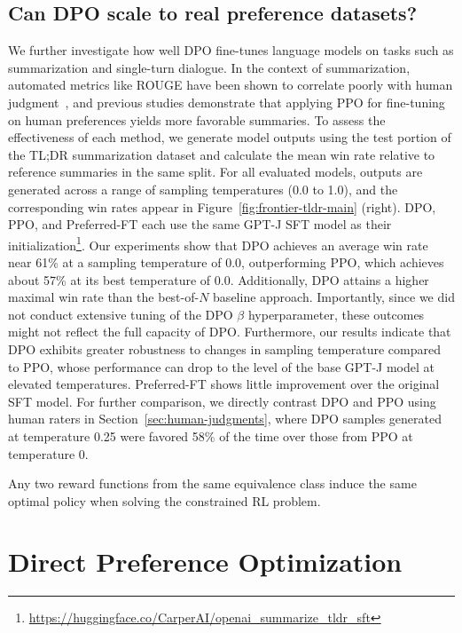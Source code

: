 \subsection{Can DPO scale to real preference datasets?}
\label{sec:dpo-real-datasets}
We further investigate how well DPO fine-tunes language models on tasks such as summarization and single-turn dialogue. In the context of summarization, automated metrics like ROUGE have been shown to correlate poorly with human judgment~\citep{stiennon2022learning}, and previous studies demonstrate that applying PPO for fine-tuning on human preferences yields more favorable summaries. To assess the effectiveness of each method, we generate model outputs using the test portion of the TL;DR summarization dataset and calculate the mean win rate relative to reference summaries in the same split. For all evaluated models, outputs are generated across a range of sampling temperatures (0.0 to 1.0), and the corresponding win rates appear in Figure~\ref{fig:frontier-tldr-main} (right). DPO, PPO, and Preferred-FT each use the same GPT-J SFT model as their initialization\footnote{\url{https://huggingface.co/CarperAI/openai_summarize_tldr_sft}}. Our experiments show that DPO achieves an average win rate near 61\% at a sampling temperature of 0.0, outperforming PPO, which achieves about 57\% at its best temperature of 0.0. Additionally, DPO attains a higher maximal win rate than the best-of-$N$ baseline approach. Importantly, since we did not conduct extensive tuning of the DPO $\beta$ hyperparameter, these outcomes might not reflect the full capacity of DPO. Furthermore, our results indicate that DPO exhibits greater robustness to changes in sampling temperature compared to PPO, whose performance can drop to the level of the base GPT-J model at elevated temperatures. Preferred-FT shows little improvement over the original SFT model. For further comparison, we directly contrast DPO and PPO using human raters in Section~\ref{sec:human-judgments}, where DPO samples generated at temperature 0.25 were favored 58\% of the time over those from PPO at temperature 0.

\begin{lemma}\label{lemma:same_policy}
    Any two reward functions from the same equivalence class induce the same optimal policy when solving the constrained RL problem.
\end{lemma}

\section{Direct Preference Optimization}\label{sec:DPO}

